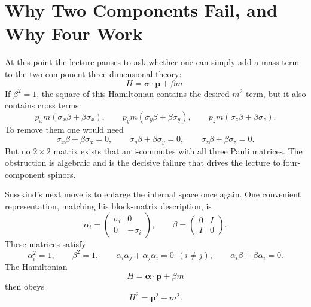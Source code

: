 \section{Why Two Components Fail, and Why Four Work}

At this point the lecture pauses to ask whether one can simply add a mass term to the two-component three-dimensional theory:
\begin{equation}
H=\boldsymbol{\sigma}\cdot\mathbf p+\beta m.
\end{equation}
If \(\beta^2=1\), the square of this Hamiltonian contains the desired \(m^2\) term, but it also contains cross terms:
\begin{equation}
p_x m(\sigma_x\beta+\beta\sigma_x),
\qquad
p_y m(\sigma_y\beta+\beta\sigma_y),
\qquad
p_z m(\sigma_z\beta+\beta\sigma_z).
\end{equation}
To remove them one would need
\begin{equation}
\sigma_x\beta+\beta\sigma_x=0,
\qquad
\sigma_y\beta+\beta\sigma_y=0,
\qquad
\sigma_z\beta+\beta\sigma_z=0.
\end{equation}
But no \(2\times2\) matrix exists that anti-commutes with all three Pauli matrices. The obstruction is algebraic and is the decisive failure that drives the lecture to four-component spinors.

Susskind's next move is to enlarge the internal space once again. One convenient representation, matching his block-matrix description, is
\begin{equation}
\alpha_i=
\begin{pmatrix}
\sigma_i&0\\
0&-\sigma_i
\end{pmatrix},
\qquad
\beta=
\begin{pmatrix}
0&I\\
I&0
\end{pmatrix}.
\end{equation}
These matrices satisfy
\begin{equation}
\alpha_i^2=1,
\qquad
\beta^2=1,
\qquad
\alpha_i\alpha_j+\alpha_j\alpha_i=0\ \ (i\neq j),
\qquad
\alpha_i\beta+\beta\alpha_i=0.
\end{equation}
The Hamiltonian
\begin{equation}
H=\boldsymbol{\alpha}\cdot\mathbf p+\beta m
\end{equation}
then obeys
\begin{equation}
H^2=\mathbf p^2+m^2.
\end{equation}

